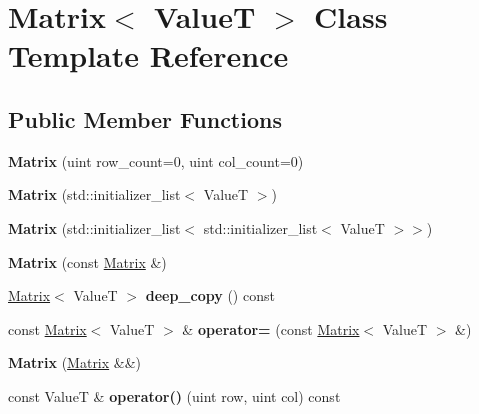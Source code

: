 \hypertarget{class_matrix}{\section{Matrix$<$ Value\-T $>$ Class Template Reference}
\label{class_matrix}
}
\subsection*{Public Member Functions}
\begin{DoxyCompactItemize}
\item 
\hypertarget{class_matrix_abaf4ed211d5f9217055a2045a6d74b9e}{{\bfseries Matrix} (uint row\-\_\-count=0, uint col\-\_\-count=0)}\label{class_matrix_abaf4ed211d5f9217055a2045a6d74b9e}

\item 
\hypertarget{class_matrix_a8cdb5e3027698e176fb573c1dbfd09d0}{{\bfseries Matrix} (std\-::initializer\-\_\-list$<$ Value\-T $>$)}\label{class_matrix_a8cdb5e3027698e176fb573c1dbfd09d0}

\item 
\hypertarget{class_matrix_aa2fc166aa58905493bc2e0e15df5c013}{{\bfseries Matrix} (std\-::initializer\-\_\-list$<$ std\-::initializer\-\_\-list$<$ Value\-T $>$$>$)}\label{class_matrix_aa2fc166aa58905493bc2e0e15df5c013}

\item 
\hypertarget{class_matrix_a440bae3243c0347cdd25729b5c14844f}{{\bfseries Matrix} (const \hyperlink{class_matrix}{Matrix} \&)}\label{class_matrix_a440bae3243c0347cdd25729b5c14844f}

\item 
\hypertarget{class_matrix_adbfe61290588ef007a31be3ef6f129cc}{\hyperlink{class_matrix}{Matrix}$<$ Value\-T $>$ {\bfseries deep\-\_\-copy} () const }\label{class_matrix_adbfe61290588ef007a31be3ef6f129cc}

\item 
\hypertarget{class_matrix_a642a23c2bb075ef71da615725168065a}{const \hyperlink{class_matrix}{Matrix}$<$ Value\-T $>$ \& {\bfseries operator=} (const \hyperlink{class_matrix}{Matrix}$<$ Value\-T $>$ \&)}\label{class_matrix_a642a23c2bb075ef71da615725168065a}

\item 
\hypertarget{class_matrix_a91a3ae68da1cb0122898551590ca0a4a}{{\bfseries Matrix} (\hyperlink{class_matrix}{Matrix} \&\&)}\label{class_matrix_a91a3ae68da1cb0122898551590ca0a4a}

\item 
\hypertarget{class_matrix_aadb242e673d09c136e9bd1b457384b0d}{const Value\-T \& {\bfseries operator()} (uint row, uint col) const }\label{class_matrix_aadb242e673d09c136e9bd1b457384b0d}


\end{DoxyCompactItemize}
